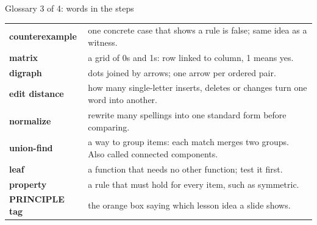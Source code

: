 \begin{frame}{Glossary 3 of 4: words in the steps}
\small
\begin{tabular}{@{}p{3.2cm}p{9.4cm}@{}}
\textbf{counterexample} & one concrete case that shows a rule is false; same idea as a witness.\\
\textbf{matrix} & a grid of 0s and 1s: row linked to column, 1 means yes.\\
\textbf{digraph} & dots joined by arrows; one arrow per ordered pair.\\
\textbf{edit distance} & how many single-letter inserts, deletes or changes turn one word into another.\\
\textbf{normalize} & rewrite many spellings into one standard form before comparing.\\
\textbf{union-find} & a way to group items: each match merges two groups. Also called connected components.\\
\textbf{leaf} & a function that needs no other function; test it first.\\
\textbf{property} & a rule that must hold for every item, such as symmetric.\\
\textbf{PRINCIPLE tag} & the orange box saying which lesson idea a slide shows.\\
\end{tabular}
\end{frame}


